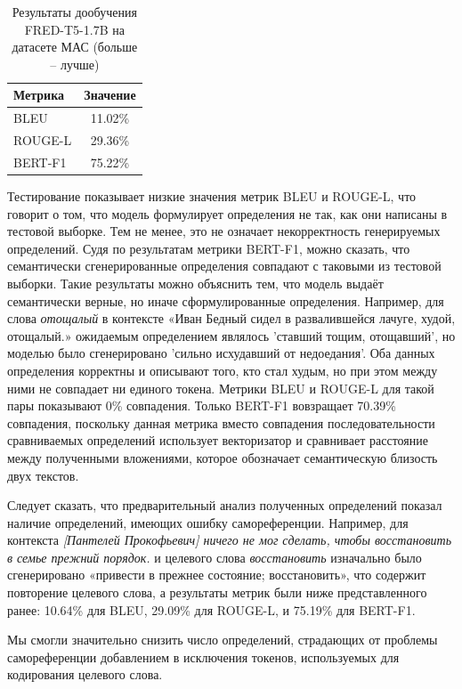 \documentclass[LI,VKR]{HSEUniversity}
\begin{document}
\begin{table}[H]
\centering
\caption{Результаты дообучения FRED-T5-1.7B на датасете МАС (больше – лучше)}
\begin{tabular}{lc}
\hline
Метрика                  & Значение \\
\hline
BLEU            & 11.02\%                  \\
ROUGE-L           & 29.36\%                  \\
BERT-F1          & 75.22\%                  \\
\hline
\end{tabular}
\end{table}

Тестирование показывает низкие значения метрик BLEU и ROUGE-L,
что говорит о том, что модель формулирует определения не так,
как они написаны в тестовой выборке.
Тем не менее, это не означает некорректность генерируемых определений.
Судя по результатам метрики BERT-F1, можно сказать, что семантически сгенерированные определения
совпадают с таковыми из тестовой выборки.
Такие результаты можно объяснить тем, что модель выдаёт семантически верные,
но иначе сформулированные определения.
Например, для слова \textit{отощалый} в контексте
«Иван Бедный сидел в развалившейся лачуге, худой, отощалый.»
ожидаемым определением являлось ’ставший тощим, отощавший’,
но моделью было сгенерировано ’сильно исхудавший от недоедания’.
Оба данных определения корректны и описывают того, кто стал худым,
но при этом между ними не совпадает ни единого токена.
Метрики BLEU и ROUGE-L для такой пары показывают 0\% совпадения.
Только BERT-F1 вовзращает 70.39\% совпадения,
поскольку данная метрика вместо совпадения последовательности сравниваемых определений
использует векторизатор и сравнивает расстояние между полученными вложениями,
которое обозначает семантическую близость двух текстов.

Следует сказать, что предварительный анализ полученных определений показал
наличие определений, имеющих ошибку самореференции.
Например, для контекста \textit{[Пантелей Прокофьевич] ничего не мог сделать, чтобы восстановить в семье прежний порядок.}
и целевого слова \textit{восстановить}
изначально было сгенерировано «привести в прежнее состояние; восстановить»,
что содержит повторение целевого слова,
а результаты метрик были ниже представленного ранее: 10.64\% для BLEU, 29.09\% для ROUGE-L, и 75.19\% для BERT-F1.

Мы смогли значительно снизить число определений,
страдающих от проблемы самореференции добавлением в исключения токенов,
используемых для кодирования целевого слова.
\end{document}
